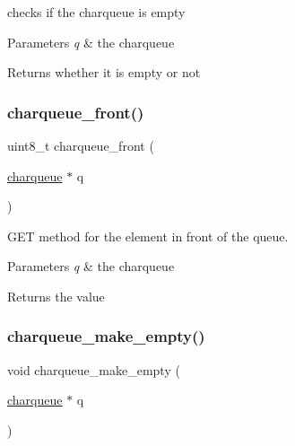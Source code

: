checks if the charqueue is empty 


\begin{DoxyParams}{Parameters}
{\em q} & the charqueue \\
\hline
\end{DoxyParams}
\begin{DoxyReturn}{Returns}
whether it is empty or not 
\end{DoxyReturn}
\mbox{\label{group__Queue_gacaa29ccb78b3a91fc2cc5feff22750da}} 
\subsubsection{\texorpdfstring{charqueue\+\_\+front()}{charqueue\_front()}}
{\footnotesize\ttfamily uint8\+\_\+t charqueue\+\_\+front (\begin{DoxyParamCaption}\item[{\hyperlink{structcharqueue}{charqueue} $\ast$}]{q }\end{DoxyParamCaption})}



G\+ET method for the element in front of the queue. 


\begin{DoxyParams}{Parameters}
{\em q} & the charqueue \\
\hline
\end{DoxyParams}
\begin{DoxyReturn}{Returns}
the value 
\end{DoxyReturn}
\mbox{\label{group__Queue_ga4c29bcf6ba2eca0528b3ac7889361b3f}} 
\subsubsection{\texorpdfstring{charqueue\+\_\+make\+\_\+empty()}{charqueue\_make\_empty()}}
{\footnotesize\ttfamily void charqueue\+\_\+make\+\_\+empty (\begin{DoxyParamCaption}\item[{\hyperlink{structcharqueue}{charqueue} $\ast$}]{q }\end{DoxyParamCaption})}



